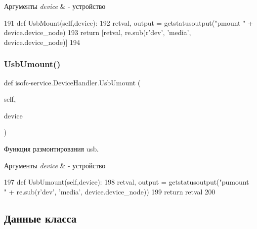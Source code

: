 \begin{DoxyParams}{Аргументы}
{\em device} & -\/ устройство \\
\hline
\end{DoxyParams}

\begin{DoxyCode}
191     \textcolor{keyword}{def }UsbMount(self,device):
192         retval, output = getstatusoutput(\textcolor{stringliteral}{"pmount "} + device.device\_node)
193         \textcolor{keywordflow}{return} [retval, re.sub(\textcolor{stringliteral}{r'dev'}, \textcolor{stringliteral}{'media'}, device.device\_node)]
194 
\end{DoxyCode}
\mbox{\label{classisofc-service_1_1DeviceHandler_aaaa9fa346a748b4acded6cc698cd5c31}} 
\subsubsection{\texorpdfstring{Usb\+Umount()}{UsbUmount()}}
{\footnotesize\ttfamily def isofc-\/service.\+Device\+Handler.\+Usb\+Umount (\begin{DoxyParamCaption}\item[{}]{self,  }\item[{}]{device }\end{DoxyParamCaption})}



Функция размонтирования usb. 


\begin{DoxyParams}{Аргументы}
{\em device} & -\/ устройство \\
\hline
\end{DoxyParams}

\begin{DoxyCode}
197     \textcolor{keyword}{def }UsbUmount(self,device):
198         retval, output = getstatusoutput(\textcolor{stringliteral}{"pumount "} + re.sub(\textcolor{stringliteral}{r'dev'}, \textcolor{stringliteral}{'media'}, device.device\_node))
199         \textcolor{keywordflow}{return} retval
200 
\end{DoxyCode}


\subsection{Данные класса}
\mbox{\label{classisofc-service_1_1DeviceHandler_a23d3bade1a4584ff598cfc9bd7cafc8b}} 

